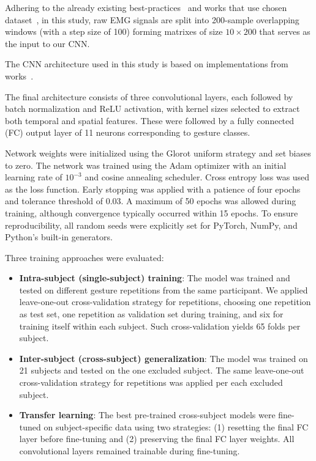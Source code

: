 Adhering to the already existing best-practices~\cite{Smith2011} and works that use chosen dataset~\cite{Cote2019_3DC,LibEMG2023}, in this study, raw EMG signals are split into 200-sample overlapping windows (with a step size of 100) forming matrixes of size $10 \times 200$ that serves as the input to our CNN. 

The CNN architecture used in this study is based on implementations from works~\cite{Cote2019_3DC,LibEMG2023}. 

The final architecture consists of three convolutional layers, each followed by batch normalization and ReLU activation, with kernel sizes selected to extract both temporal and spatial features. These were followed by a fully connected (FC) output layer of 11 neurons corresponding to gesture classes.

Network weights were initialized using the Glorot uniform strategy and set biases to zero. The network was trained using the Adam optimizer with an initial learning rate of $10^{-3}$ and cosine annealing scheduler. Cross entropy loss was used as the loss function. Early stopping was applied with a patience of four epochs and tolerance threshold of 0.03. A maximum of 50 epochs was allowed during training, although convergence typically occurred within 15 epochs. To ensure reproducibility, all random seeds were explicitly set for PyTorch, NumPy, and Python’s built-in generators.

Three training approaches were evaluated:

\begin{itemize}
    \item \textbf{Intra-subject (single-subject) training}: The model was trained and tested on different gesture repetitions from the same participant. We applied leave-one-out cross-validation strategy for repetitions, choosing one repetition as test set, one repetition as validation set during training, and six for training itself within each subject. Such cross-validation yields 65 folds per subject.
    \item \textbf{Inter-subject (cross-subject) generalization}: The model was trained on 21 subjects and tested on the one excluded subject. The same leave-one-out cross-validation strategy for repetitions was applied per each excluded subject.
    \item \textbf{Transfer learning}: The best pre-trained cross-subject models were fine-tuned on subject-specific data using two strategies: (1) resetting the final FC layer before fine-tuning and (2) preserving the final FC layer weights. All convolutional layers remained trainable during fine-tuning.
\end{itemize}

